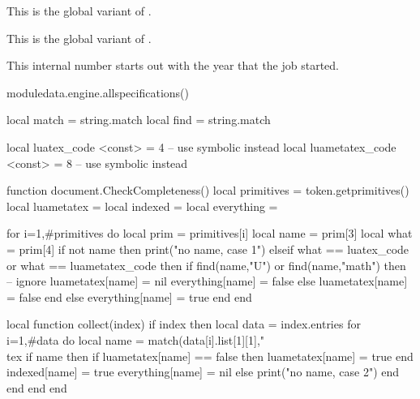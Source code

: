 \startnewprimitive[title={\prm {xtoksapp}}]

This is the global variant of .

\stopnewprimitive

\startnewprimitive[title={\prm {xtokspre}}]

This is the global variant of .

\stopnewprimitive

\startoldprimitive[title={\prm {year}}]

This internal number starts out with the year that the job started.

\stopoldprimitive

\stopsection

\glet\foo\relax

\page

\startsection[title=Syntax]


\startpagecolumns[page=no]
    \startluacode
        moduledata.engine.allspecifications()
    \stopluacode
\stoppagecolumns

\stopsection

\page

\startluacode
    local match = string.match
    local find  = string.match

    local luatex_code     <const> = 4 -- use symbolic instead
    local luametatex_code <const> = 8 -- use symbolic instead

    function document.CheckCompleteness()
        local primitives = token.getprimitives()
        local luametatex = { }
        local indexed    = { }
        local everything = { }

        for i=1,#primitives do
            local prim = primitives[i]
            local name = prim[3]
            local what = prim[4]
            if not name then
                print("no name, case 1")
            elseif what == luatex_code or what == luametatex_code then
                if find(name,"U") or find(name,"math") then
                    -- ignore
                    luametatex[name] = nil
                    everything[name] = false
                else
                    luametatex[name] = false
                end
            else
                everything[name] = true
            end
        end

        local function collect(index)
            if index then
                local data = index.entries
                for i=1,#data do
                    local name = match(data[i].list[1][1],"\\tex%
                    if name then
                        if luametatex[name] == false then
                            luametatex[name] = true
                        end
                        indexed[name] = true
                        everything[name] = nil
                    else
                        print("no name, case 2")
                    end
                end
            end
        end

